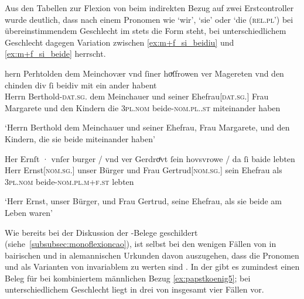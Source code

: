 Aus den Tabellen  zur Flexion
von  beim indirekten Bezug auf zwei Erstcontroller wurde deutlich,
dass nach einem Pronomen wie
 `wir',  `sie' oder  `die
(\textsc{rel.pl')} bei übereinstimmendem Geschlecht im \CAO{} stets die Form
 steht, bei unterschiedlichem Geschlecht dagegen Variation zwischen
 \cref{ex:m+f_si_beidiu} und  \cref{ex:m+f_si_beide}
herrscht.

\begin{exe}
\ex \label{ex:m+f_si_beide_iu}
	\begin{xlist}
	\ex \label{ex:m+f_si_beidiu}
		\gll hern Perhtolden dem Meinchovær vnd ſiner hoͮſfrowen ver
				Magereten vnd den chinden div ſi beidiv {mit
				ein ander} habent \\
			Herrn Berthold-\textsc{dat.sg.\MascM} dem Meinchauer und seiner
				Ehefrau[\textsc{dat.sg.\FemF}] Frau Margarete und den Kindern die
				\textsc{3pl\subMF.nom} beide-\textsc{nom.pl.\NeutMF.st} miteinander
				haben \\
		\begin{taggedline}{\parencites(Regensburg, 1287)[\pno~937, 292.40--41]{cao2}}
		\trans `Herrn Berthold dem Meinchauer und seiner Ehefrau, Frau 
			Margarete, und den Kindern, die sie beide miteinander haben'
		\end{taggedline}

	\ex \label{ex:m+f_si_beide}
		\gll Her Ernſt · vnſer burger / vnd ver Gerdroͤvt ſein
				hovsvrowe / da ſi baide lebten \\
			Herr Ernst[\textsc{nom.sg.\MascM}] {} unser Bürger {} und Frau
				Gertrud[\textsc{nom.sg.\FemF}] sein Ehefrau {} als \textsc{3pl\subMF.nom}
				beide-\textsc{nom.pl.m+f\subMF.st} lebten \\
		\begin{taggedline}{\parencites(Wien, 1289)[\pno~1073, 374.40--41]{cao2}}
		\trans `Herr Ernst, unser Bürger, und Frau Gertrud, seine Ehefrau,
			als sie beide am Leben waren'
		\end{taggedline}
	\end{xlist}
\end{exe}

Wie bereits bei der Diskussion der \CAO{}-Belege geschildert
(siehe~\cref{subsubsec:monoflexioncao}), ist selbst bei den wenigen Fällen von
 in bairischen und  in alemannischen Urkunden
davon auszugehen, dass die Pronomen  und  als Varianten von
invariablem  zu werten sind \autocite[vgl.][394--396]{ksw2}. In der
\KC{} gibt es zumindest einen Beleg für  bei kombiniertem
männlichen Bezug \cref{ex:papstkoenig5}; bei unterschiedlichem Geschlecht liegt
 in drei von insgesamt vier Fällen vor.

